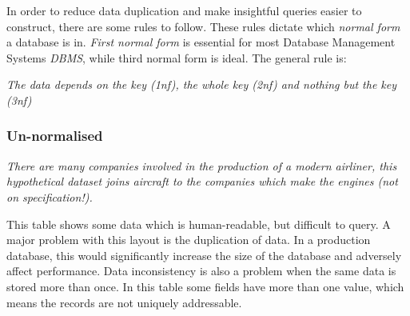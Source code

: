 \documentclass[9pt]{article}
\begin{document}
In order to reduce data duplication and make insightful queries easier to construct, there are some rules to follow. These rules dictate which \emph{normal form} a database is in. \emph{First normal form} is essential for most Database Management Systems \emph{DBMS}, while third normal form is ideal. The general rule is:

\emph{The data depends on the key (1nf), the whole key (2nf) and nothing but the key (3nf)}

\subsubsection{Un-normalised}
\label{sec:orgeb4482f}

\emph{There are many companies involved in the production of a modern airliner, this hypothetical dataset joins aircraft to the companies which make the engines (not on specification!).}

This table shows some data which is human-readable, but difficult to query. A major problem with this layout is the duplication of data. In a production database, this would significantly increase the size of the database and adversely affect performance. Data inconsistency is also a problem when the same data is stored more than once. In this table some fields have more than one value, which means the records are not uniquely addressable.
\end{document}
